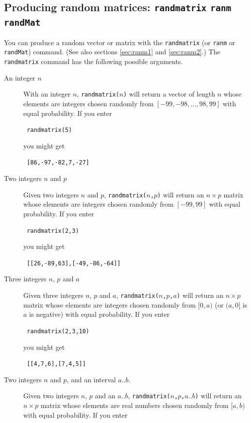 \documentclass[a4paper,11pt]{book}
\begin{document}
\subsection{Producing random matrices: \texttt{randmatrix} \texttt{ranm} \texttt{randMat}}

You can produce a random vector or matrix with the \texttt{randmatrix}
(or \texttt{ranm} or \texttt{randMat}) command.  (See also sections
\ref{sec:ranm1} and \ref{sec:ranm2}.) The \texttt{randmatrix} command
has the following possible arguments.
\begin{description}
\item[An integer $n$]
With an integer $n$, \texttt{randmatrix($n$)} will return a vector of
length $n$ whose elements are integers chosen randomly from
$[-99,-98,\dots,98,99]$ with equal probability.  If you enter
\begin{center}
  \tt
  randmatrix(5)
\end{center}
you might get
\begin{center}
  \tt
  [86,-97,-82,7,-27]
\end{center}
\item[Two integers $n$ and $p$]
Given two integers $n$ and $p$, \texttt{randmatrix($n$,$p$)} will
return an $n\times p$ matrix whose elements are integers chosen randomly from
$[-99,99]$ with equal probability.  If you enter
\begin{center}
  \tt
  randmatrix(2,3)
\end{center}
you might get
\begin{center}
  \tt
  [[26,-89,63],[-49,-86,-64]]  
\end{center}
\item[Three integers $n$, $p$ and $a$]
Given three integers $n$, $p$ and $a$, \texttt{randmatrix($n$,$p$,$a$)} will
return an $n\times p$ matrix whose elements are integers chosen randomly from
$[0,a)$ (or $(a,0]$ is $a$ is negative) with equal probability.  If you enter
\begin{center}
  \tt
  randmatrix(2,3,10)
\end{center}
you might get
\begin{center}
  \tt
    [[4,7,6],[7,4,5]]
\end{center}
\item[Two integers $n$ and $p$, and an interval $a..b$.]
Given two integers $n$, $p$ and an $a..b$,
\texttt{randmatrix($n$,$p$,$a..b$)} will
return an $n\times p$ matrix whose elements are real numbers chosen randomly from
$[a,b)$ with equal probability.  If you enter

\end{description}
\end{document}
